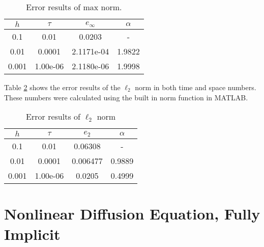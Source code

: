     \begin{table}[H]
	\begin{center}
		\begin{tabular}{ | c | c | c | c |}
			\hline
			$h$ & $\tau$ & $e_{\infty} $ & $\alpha$ \\ 
			\hline
			 0.1 & 0.01 & 0.0203 & - \\  
			\hline
			 0.01 & 0.0001 &  2.1171e-04 & 1.9822   \\
			 \hline
			 0.001 & 1.00e-06 &  2.1180e-06 &  1.9998  \\
			\hline
		\end{tabular}
        \caption{Error results of max norm.}
        \label{tab:conv1}
	\end{center}
\end{table}

Table \ref{tab:conv2} shows the error results of the $\ell_2$ norm in both time and space numbers. These numbers were calculated using the built in norm function in MATLAB. 
 \begin{table}[H]
	\begin{center}

		\begin{tabular}{ | c | c | c | c |}
			\hline
			$h$ & $\tau$ & $e_{2} $ & $\alpha$ \\ 
			\hline
			0.1 & 0.01 & 0.06308 & - \\  
			\hline
			0.01 & 0.0001 &  0.006477 &  0.9889  \\
			\hline
			0.001 & 1.00e-06 &  0.0205 &   0.4999 \\
			\hline
		\end{tabular}
        \caption{Error results of $\ell_2$ norm}    
        \label{tab:conv2} 
	\end{center}
   \end{table}
   
   
   \section{Nonlinear Diffusion Equation, Fully Implicit}
